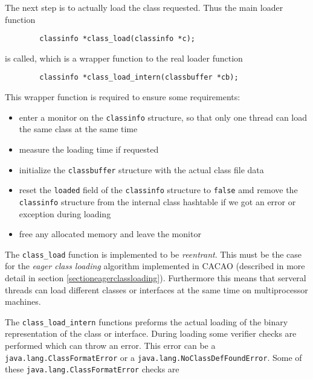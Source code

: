 The next step is to actually load the class requested. Thus the main
loader function

\begin{verbatim}
        classinfo *class_load(classinfo *c);
\end{verbatim}

is called, which is a wrapper function to the real loader function

\begin{verbatim}
        classinfo *class_load_intern(classbuffer *cb);
\end{verbatim}

This wrapper function is required to ensure some requirements:

\begin{itemize}
 \item enter a monitor on the \texttt{classinfo} structure, so that
 only one thread can load the same class at the same time

 \item measure the loading time if requested

 \item initialize the \texttt{classbuffer} structure with the actual
 class file data

 \item reset the \texttt{loaded} field of the \texttt{classinfo}
 structure to \texttt{false} amd remove the \texttt{classinfo}
 structure from the internal class hashtable if we got an error or
 exception during loading

 \item free any allocated memory and leave the monitor
\end{itemize}

The \texttt{class\_load} function is implemented to be
\textit{reentrant}. This must be the case for the \textit{eager class
loading} algorithm implemented in CACAO (described in more detail in
section \ref{sectioneagerclassloading}). Furthermore this means that
serveral threads can load different classes or interfaces at the same
time on multiprocessor machines.

The \texttt{class\_load\_intern} functions preforms the actual loading
of the binary representation of the class or interface. During loading
some verifier checks are performed which can throw an error. This
error can be a \texttt{java.lang.ClassFormatError} or a
\texttt{java.lang.NoClassDefFoundError}. Some of these
\texttt{java.lang.ClassFormatError} checks are

